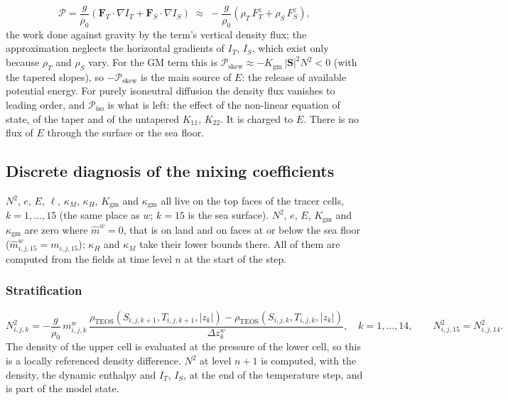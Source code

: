 \documentclass{article}
\begin{document}
\[
\mathcal{P} = \frac{g}{\rho_0}\left( \mathbf{F}_T\cdot\nabla I_T + \mathbf{F}_S\cdot\nabla I_S \right)
\;\approx\; -\frac{g}{\rho_0}\left( \rho_T\,F_T^z + \rho_S\,F_S^z \right),
\]
the work done against gravity by the term's vertical density flux; the approximation neglects the horizontal gradients of $I_T$, $I_S$, which exist only because $\rho_T$ and $\rho_S$ vary.
For the GM term this is $\mathcal{P}_\text{skew} \approx -K_\text{gm}\,|\mathbf{S}|^2 N^2 < 0$ (with the tapered slopes), so $-\mathcal{P}_\text{skew}$ is the main source of $E$: the release of available potential energy.
For purely isoneutral diffusion the density flux vanishes to leading order, and $\mathcal{P}_\text{iso}$ is what is left: the effect of the non-linear equation of state, of the taper and of the untapered $K_{11}$, $K_{22}$. It is charged to $E$.
There is no flux of $E$ through the surface or the sea floor.

\subsection{Discrete diagnosis of the mixing coefficients}\label{sec:coefficients}

$N^2$, $e$, $E$, $\ell$, $\kappa_M$, $\kappa_H$, $K_\text{gm}$ and $\kappa_\text{gm}$ all live on the top faces of the tracer cells, $k = 1,\dots,15$ (the same place as $w$; $k=15$ is the sea surface). $N^2$, $e$, $E$, $K_\text{gm}$ and $\kappa_\text{gm}$ are zero where $\hat m^w = 0$, that is on land and on faces at or below the sea floor ($\hat m^w_{i,j,15} = m_{i,j,15}$); $\kappa_H$ and $\kappa_M$ take their lower bounds there.
All of them are computed from the fields at time level $n$ at the start of the step.

\subsubsection*{Stratification}
\[
N^2_{i,j,k} = -\frac{g}{\rho_0}\, m^w_{i,j,k}\, \frac{\rho_\text{TEOS}(S_{i,j,k+1}, T_{i,j,k+1}, |z_k|) - \rho_\text{TEOS}(S_{i,j,k}, T_{i,j,k}, |z_k|)}{\Delta z^w_k}, \quad k = 1,\dots,14,
\qquad
N^2_{i,j,15} = N^2_{i,j,14}.
\]
The density of the upper cell is evaluated at the pressure of the lower cell, so this is a locally referenced density difference.
$N^2$ at level $n+1$ is computed, with the density, the dynamic enthalpy and $I_T$, $I_S$, at the end of the temperature step, and is part of the model state.
\end{document}
